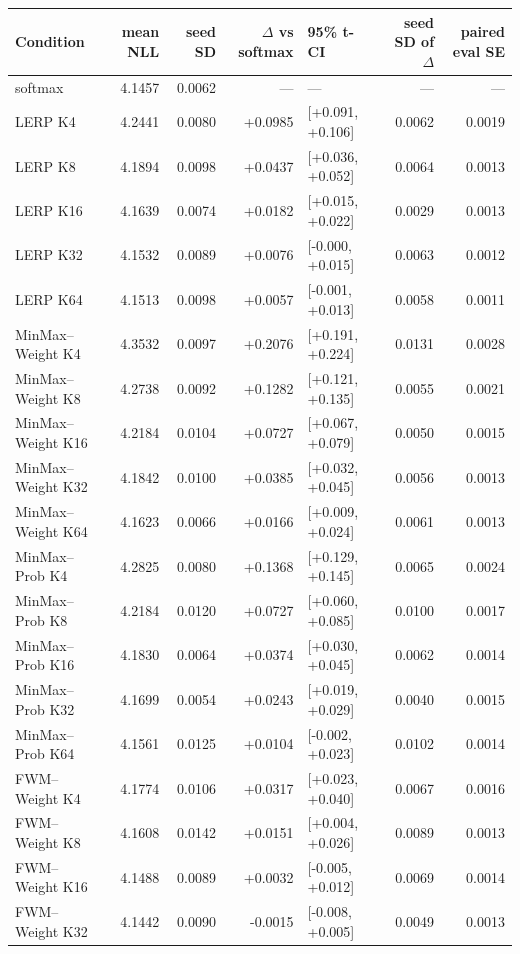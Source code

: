\begin{tabular}{lrrrlrr}
\toprule
Condition & mean NLL & seed SD & $\Delta$ vs softmax & 95\% t-CI & seed SD of $\Delta$ & paired eval SE \\
\midrule
softmax & 4.1457 & 0.0062 & --- & --- & --- & --- \\
LERP K4 & 4.2441 & 0.0080 & +0.0985 & [+0.091, +0.106] & 0.0062 & 0.0019 \\
LERP K8 & 4.1894 & 0.0098 & +0.0437 & [+0.036, +0.052] & 0.0064 & 0.0013 \\
LERP K16 & 4.1639 & 0.0074 & +0.0182 & [+0.015, +0.022] & 0.0029 & 0.0013 \\
LERP K32 & 4.1532 & 0.0089 & +0.0076 & [-0.000, +0.015] & 0.0063 & 0.0012 \\
LERP K64 & 4.1513 & 0.0098 & +0.0057 & [-0.001, +0.013] & 0.0058 & 0.0011 \\
MinMax--Weight K4 & 4.3532 & 0.0097 & +0.2076 & [+0.191, +0.224] & 0.0131 & 0.0028 \\
MinMax--Weight K8 & 4.2738 & 0.0092 & +0.1282 & [+0.121, +0.135] & 0.0055 & 0.0021 \\
MinMax--Weight K16 & 4.2184 & 0.0104 & +0.0727 & [+0.067, +0.079] & 0.0050 & 0.0015 \\
MinMax--Weight K32 & 4.1842 & 0.0100 & +0.0385 & [+0.032, +0.045] & 0.0056 & 0.0013 \\
MinMax--Weight K64 & 4.1623 & 0.0066 & +0.0166 & [+0.009, +0.024] & 0.0061 & 0.0013 \\
MinMax--Prob K4 & 4.2825 & 0.0080 & +0.1368 & [+0.129, +0.145] & 0.0065 & 0.0024 \\
MinMax--Prob K8 & 4.2184 & 0.0120 & +0.0727 & [+0.060, +0.085] & 0.0100 & 0.0017 \\
MinMax--Prob K16 & 4.1830 & 0.0064 & +0.0374 & [+0.030, +0.045] & 0.0062 & 0.0014 \\
MinMax--Prob K32 & 4.1699 & 0.0054 & +0.0243 & [+0.019, +0.029] & 0.0040 & 0.0015 \\
MinMax--Prob K64 & 4.1561 & 0.0125 & +0.0104 & [-0.002, +0.023] & 0.0102 & 0.0014 \\
FWM--Weight K4 & 4.1774 & 0.0106 & +0.0317 & [+0.023, +0.040] & 0.0067 & 0.0016 \\
FWM--Weight K8 & 4.1608 & 0.0142 & +0.0151 & [+0.004, +0.026] & 0.0089 & 0.0013 \\
FWM--Weight K16 & 4.1488 & 0.0089 & +0.0032 & [-0.005, +0.012] & 0.0069 & 0.0014 \\
FWM--Weight K32 & 4.1442 & 0.0090 & -0.0015 & [-0.008, +0.005] & 0.0049 & 0.0013 \\

\end{tabular}
